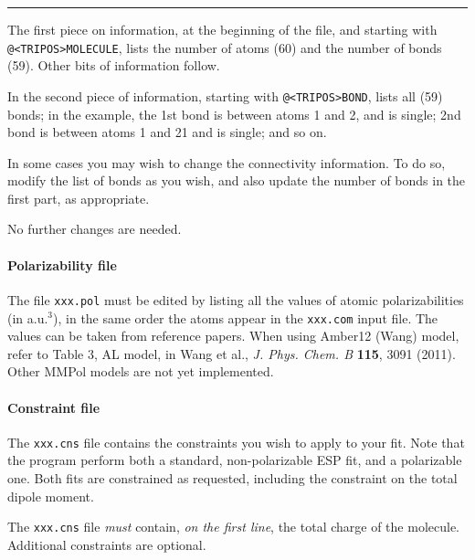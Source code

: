 \documentclass[a4paper]{report}
\begin{document}
\rule{8cm}{1pt}

The first piece on information, at the beginning of the file, and starting with
\texttt{@<TRIPOS>MOLECULE}, lists the number of atoms (60) and the number of bonds
(59). Other bits of information follow.

In the second piece of information, starting with \texttt{@<TRIPOS>BOND}, lists all
(59) bonds; in the example, the 1st bond is between atoms 1 and 2, and is single; 2nd
bond is between atoms 1 and 21 and is single; and so on.

In some cases you may wish to change the connectivity information. To do so, modify
the list of bonds as you wish, and also update the number of bonds in the first part,
as appropriate.

No further changes are needed. 

\paragraph*{Polarizability file}

The file \texttt{xxx.pol} must be edited by listing all the values of atomic
polarizabilities (in a.u.$^3$), in the same order the atoms appear in the
\texttt{xxx.com} input file. The values can be taken from reference papers. When
using Amber12 (Wang) model, refer to Table 3, AL model, in Wang et al., \emph{J.
Phys. Chem. B} \textbf{115}, 3091 (2011). Other MMPol models are not yet implemented.

\paragraph*{Constraint file}

The \texttt{xxx.cns} file contains the constraints you wish to apply to your
fit. Note that the program perform both a standard, non-polarizable ESP fit, and a
polarizable one. Both fits are constrained as requested, including the constraint on
the total dipole moment.

The \texttt{xxx.cns} file \emph{must} contain, \emph{on the first line}, the total
charge of the molecule. Additional constraints are optional.
\end{document}
